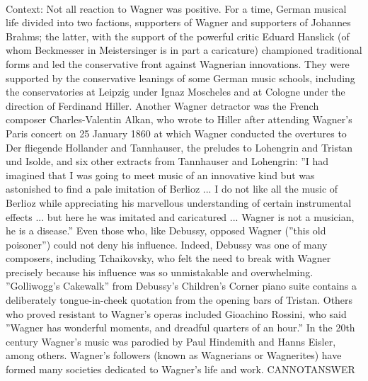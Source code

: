 \documentclass[11pt,a4paper, onecolumn]{article}
\begin{document}
\\ Context: Not all reaction to Wagner was positive. For a time, German musical life divided into two factions, supporters of Wagner and supporters of Johannes Brahms; the latter, with the support of the powerful critic Eduard Hanslick (of whom Beckmesser in Meistersinger is in part a caricature) championed traditional forms and led the conservative front against Wagnerian innovations. They were supported by the conservative leanings of some German music schools, including the conservatories at Leipzig under Ignaz Moscheles and at Cologne under the direction of Ferdinand Hiller. Another Wagner detractor was the French composer Charles-Valentin Alkan, who wrote to Hiller after attending Wagner's Paris concert on 25 January 1860 at which Wagner conducted the overtures to Der fliegende Hollander and Tannhauser, the preludes to Lohengrin and Tristan und Isolde, and six other extracts from Tannhauser and Lohengrin: ''I had imagined that I was going to meet music of an innovative kind but was astonished to find a pale imitation of Berlioz ... I do not like all the music of Berlioz while appreciating his marvellous understanding of certain instrumental effects ... but here he was imitated and caricatured ... Wagner is not a musician, he is a disease.'' Even those who, like Debussy, opposed Wagner (''this old poisoner'') could not deny his influence. Indeed, Debussy was one of many composers, including Tchaikovsky, who felt the need to break with Wagner precisely because his influence was so unmistakable and overwhelming. ''Golliwogg's Cakewalk'' from Debussy's Children's Corner piano suite contains a deliberately tongue-in-cheek quotation from the opening bars of Tristan. Others who proved resistant to Wagner's operas included Gioachino Rossini, who said ''Wagner has wonderful moments, and dreadful quarters of an hour.'' In the 20th century Wagner's music was parodied by Paul Hindemith and Hanns Eisler, among others. Wagner's followers (known as Wagnerians or Wagnerites) have formed many societies dedicated to Wagner's life and work. CANNOTANSWER
\end{document}
